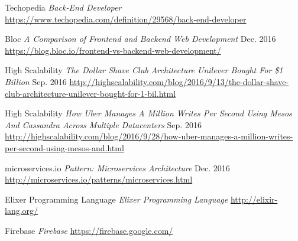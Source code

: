 \begin{thebibliography}{9}
	Techopedia
	\emph{Back-End Developer}
	\url{https://www.techopedia.com/definition/29568/back-end-developer}
	
	Bloc
	\emph{A Comparison of Frontend and Backend Web Development}
	Dec. 2016
	\url{https://blog.bloc.io/frontend-vs-backend-web-development/}
	
	High Scalability
	\emph{The Dollar Shave Club Architecture Unilever Bought For \$1 Billion}
	Sep. 2016
	\url{http://highscalability.com/blog/2016/9/13/the-dollar-shave-club-architecture-unilever-bought-for-1-bil.html}
	
		High Scalability
	\emph{How Uber Manages A Million Writes Per Second Using Mesos And Cassandra Across Multiple Datacenters}
	Sep. 2016
	\url{http://highscalability.com/blog/2016/9/28/how-uber-manages-a-million-writes-per-second-using-mesos-and.html}
	
	microservices.io
	\emph{Pattern: Microservices Architecture}
	Dec. 2016
	\url{http://microservices.io/patterns/microservices.html}
	
	Elixer Programming Language
	\emph{Elixer Programming Language}
	\url{http://elixir-lang.org/}
	
	Firebase
	\emph{Firebase}
	\url{https://firebase.google.com/}
	
\end{thebibliography}